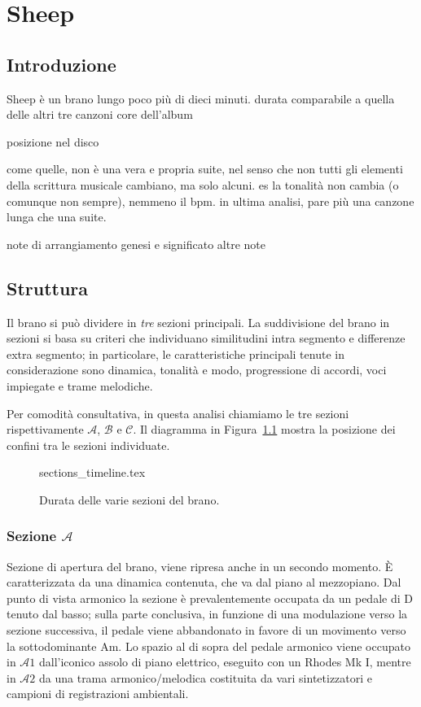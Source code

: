 \documentclass[class=book, crop=false, oneside, 12pt]{standalone}
\begin{document}
    \chapter{Sheep}

    \section{Introduzione}
    \label{sec:04-intro}

    Sheep è un brano lungo poco più di dieci minuti. 
    durata comparabile a quella delle altri tre canzoni core dell'album

    posizione nel disco
    
    
    come quelle, non è una vera e propria suite, nel senso che non tutti gli elementi della scrittura musicale cambiano, ma solo alcuni. es la tonalità non cambia (o comunque non sempre), nemmeno il bpm. in ultima analisi, pare più una canzone lunga che una suite.

    note di arrangiamento
    genesi e significato
    altre note



    \section{Struttura}
    \label{sec:04-struttura}

    Il brano si può dividere in \emph{tre} sezioni principali.
    La suddivisione del brano in sezioni si basa su criteri che individuano similitudini intra segmento e differenze extra segmento; in particolare, le caratteristiche principali tenute in considerazione sono dinamica, tonalità e modo, progressione di accordi, voci impiegate e trame melodiche.

    Per comodità consultativa, in questa analisi chiamiamo le tre sezioni rispettivamente \(\mathcal{A}\), \(\mathcal{B}\) e \(\mathcal{C}\). Il diagramma in Figura~\ref{fig:04-sections-timeline} mostra la posizione dei confini tra le sezioni individuate.

    \begin{figure}[htbp]
        \centering
        {sections_timeline.tex}
        \label{fig:04-sections-timeline}
        \caption{Durata delle varie sezioni del brano.}
    \end{figure}

    \subsection*{Sezione \(\mathcal{A}\)}
    Sezione di apertura del brano, viene ripresa anche in un secondo momento. È caratterizzata da una dinamica contenuta, che va dal piano al mezzopiano. Dal punto di vista armonico la sezione è prevalentemente occupata da un pedale di D tenuto dal basso; sulla parte conclusiva, in funzione di una modulazione verso la sezione successiva, il pedale viene abbandonato in favore di un movimento verso la sottodominante Am. Lo spazio al di sopra del pedale armonico viene occupato in \(\mathcal{A}1\) dall'iconico assolo di piano elettrico, eseguito con un Rhodes Mk I, mentre in \(\mathcal{A}2\) da una trama armonico/melodica costituita da vari sintetizzatori e campioni di registrazioni ambientali.
\end{document}
